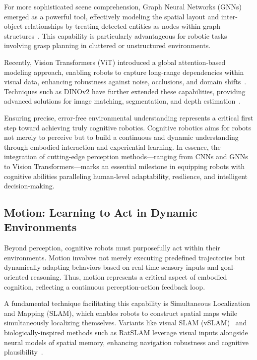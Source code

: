 \documentclass[conference]{IEEEtran}
\begin{document}
For more sophisticated scene comprehension, Graph Neural Networks (GNNs) emerged as a powerful tool, effectively modeling the spatial layout and inter-object relationships by treating detected entities as nodes within graph structures~\cite{lin2022efficient}. This capability is particularly advantageous for robotic tasks involving grasp planning in cluttered or unstructured environments.

Recently, Vision Transformers (ViT) introduced a global attention-based modeling approach, enabling robots to capture long-range dependencies within visual data, enhancing robustness against noise, occlusions, and domain shifts~\cite{dosovitskiy2020image}. Techniques such as DINOv2 have further extended these capabilities, providing advanced solutions for image matching, segmentation, and depth estimation~\cite{oquab2023dinov2}.

Ensuring precise, error-free environmental understanding represents a critical first step toward achieving truly cognitive robotics. Cognitive robotics aims for robots not merely to perceive but to build a continuous and dynamic understanding through embodied interaction and experiential learning. In essence, the integration of cutting-edge perception methods—ranging from CNNs and GNNs to Vision Transformers—marks an essential milestone in equipping robots with cognitive abilities paralleling human-level adaptability, resilience, and intelligent decision-making.

\subsection{Motion: Learning to Act in Dynamic Environments}

Beyond perception, cognitive robots must purposefully act within their environments. Motion involves not merely executing predefined trajectories but dynamically adapting behaviors based on real-time sensory inputs and goal-oriented reasoning. Thus, motion represents a critical aspect of embodied cognition, reflecting a continuous perception-action feedback loop.

A fundamental technique facilitating this capability is Simultaneous Localization and Mapping (SLAM), which enables robots to construct spatial maps while simultaneously localizing themselves. Variants like visual SLAM (vSLAM)~\cite{grisetti2010tutorial} and biologically-inspired methods such as RatSLAM leverage visual inputs alongside neural models of spatial memory, enhancing navigation robustness and cognitive plausibility~\cite{milford2004ratslam}.
\end{document}
